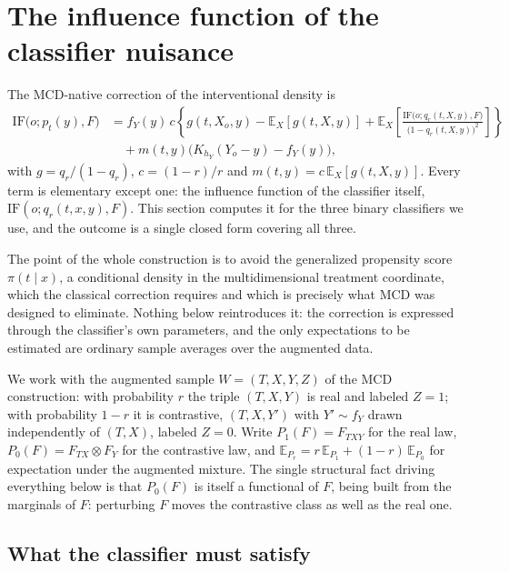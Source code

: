 \documentclass[11pt]{article}
\newcommand{\Eb}{\mathbb{E}}
\newcommand{\IF}{\mathrm{IF}}
\begin{document}
\section{The influence function of the classifier nuisance}
\label{sec:if-qr}

The MCD-native correction of the interventional density is
\begin{equation}
\begin{aligned}
\IF\big(o;p_t(y),F\big)
&= f_Y(y)\,c\left\{ g(t,X_o,y) - \Eb_X[g(t,X,y)]
+ \Eb_X\!\left[\frac{\IF\big(o;q_r(t,X,y),F\big)}{\big(1-q_r(t,X,y)\big)^2}\right] \right\} \\
&\quad + m(t,y)\big(K_{h_Y}(Y_o-y)-f_Y(y)\big),
\end{aligned}
\label{eq:if-mcd-native}
\end{equation}
with $g=q_r/(1-q_r)$, $c=(1-r)/r$ and $m(t,y)=c\,\Eb_X[g(t,X,y)]$. Every term is
elementary except one: the influence function of the classifier itself,
$\IF(o;q_r(t,x,y),F)$. This section computes it for the three binary classifiers we
use, and the outcome is a single closed form covering all three.

The point of the whole construction is to avoid the generalized propensity score
$\pi(t\mid x)$, a conditional density in the multidimensional treatment coordinate,
which the classical correction requires and which is precisely what MCD was designed
to eliminate. Nothing below reintroduces it: the correction is expressed through the
classifier's own parameters, and the only expectations to be estimated are ordinary
sample averages over the augmented data.

We work with the augmented sample $W=(T,X,Y,Z)$ of the MCD construction: with
probability $r$ the triple $(T,X,Y)$ is real and labeled $Z=1$; with probability
$1-r$ it is contrastive, $(T,X,Y')$ with $Y'\sim f_Y$ drawn independently of
$(T,X)$, labeled $Z=0$. Write $P_1(F)=F_{TXY}$ for the real law, $P_0(F)=F_{TX}\otimes
F_Y$ for the contrastive law, and $\Eb_{P_r}=r\,\Eb_{P_1}+(1-r)\,\Eb_{P_0}$ for
expectation under the augmented mixture. The single structural fact driving
everything below is that $P_0(F)$ is itself a functional of $F$, being built from the
marginals of $F$: perturbing $F$ moves the contrastive class as well as the real one.

\subsection{What the classifier must satisfy}
\label{sec:if-qr-regularity}
\end{document}
